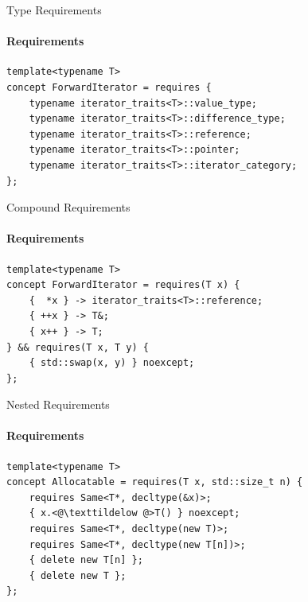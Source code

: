 \documentclass{beamer}
\begin{document}
    \begin{frame}[fragile]{Type Requirements}
        \framesubtitle{Requirements}
        \begin{center}
        \begin{lstlisting}[caption={type requirements in our incomplete \texttt{ForwardIterator}.}]
template<typename T>
concept ForwardIterator = requires {
    typename iterator_traits<T>::value_type;
    typename iterator_traits<T>::difference_type;
    typename iterator_traits<T>::reference;
    typename iterator_traits<T>::pointer;
    typename iterator_traits<T>::iterator_category;
}; \end{lstlisting}
        \end{center}
    \end{frame}

    \begin{frame}[fragile]{Compound Requirements}
        \framesubtitle{Requirements}
        \begin{center}
        \begin{lstlisting}[caption={compound requirements found in an \texttt{ForwardIterator}.}]
template<typename T>
concept ForwardIterator = requires(T x) {
    {  *x } -> iterator_traits<T>::reference;
    { ++x } -> T&;
    { x++ } -> T;
} && requires(T x, T y) {
    { std::swap(x, y) } noexcept;
}; \end{lstlisting}
        \end{center}
    \end{frame}

    \begin{frame}[fragile]{Nested Requirements}
        \framesubtitle{Requirements}
        \begin{center}
        \begin{lstlisting}[caption={usage of nested requirement in an \texttt{Allocatable} concept.}]
template<typename T>
concept Allocatable = requires(T x, std::size_t n) {
    requires Same<T*, decltype(&x)>;
    { x.<@\texttildelow @>T() } noexcept;
    requires Same<T*, decltype(new T)>;
    requires Same<T*, decltype(new T[n])>;
    { delete new T[n] };
    { delete new T };
}; \end{lstlisting}
        \end{center}
    \end{frame}
\end{document}
